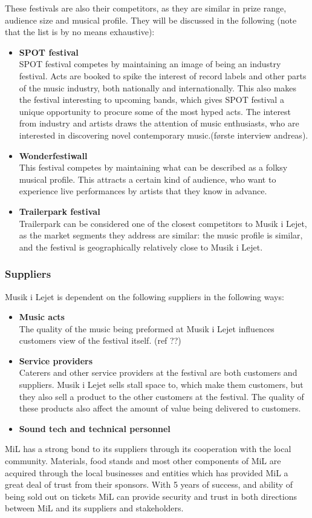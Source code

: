 These festivals are also their competitors, as they are similar in prize range, audience size and musical profile. They will be discussed in the following (note that the list is by no means exhaustive):
\begin{itemize}
	\item \textbf{SPOT festival}\\
	SPOT festival competes by maintaining an image of being an industry festival. Acts are booked to spike the interest of record labels and other parts of the music industry, both nationally and internationally. This also makes the festival interesting to upcoming bands, which gives SPOT festival a unique opportunity to procure some of the most hyped acts. The interest from industry and artists draws the attention of music enthusiasts, who are interested in discovering novel contemporary music.(første interview andreas).
	\item \textbf{Wonderfestiwall}\\
	This festival competes by maintaining what can be described as a folksy musical profile. This attracts a certain kind of audience, who want to experience live performances by artists that they know in advance.
	\item \textbf{Trailerpark festival}\\
	Trailerpark can be considered one of the closest competitors to Musik i Lejet, as the market segments they address are similar: the music profile is similar, and the festival is geographically relatively close to Musik i Lejet.
\end{itemize}


\subsubsection{Suppliers}
Musik i Lejet is dependent on the following suppliers in the following ways:
\begin{itemize}
	\item \textbf{Music acts}\\
	The quality of the music being preformed at Musik i Lejet influences customers view of the festival itself. (ref ??)
	\item \textbf{Service providers}\\
	Caterers and other service providers at the festival are both customers and suppliers. Musik i Lejet sells stall space to, which make them customers, but they also sell a product to the other customers at the festival. The quality of these products also affect the amount of value being delivered to customers.
	\item \textbf{Sound tech and technical personnel}\\

\end{itemize}

MiL has a strong bond to its suppliers through its cooperation with the local community. Materials, food stands and most other components of MiL are acquired through the local businesses and entities which has provided MiL a great deal of trust from their sponsors. With 5 years of success, and ability of being sold out on tickets MiL can provide security and trust in both directions between MiL and its suppliers and stakeholders.